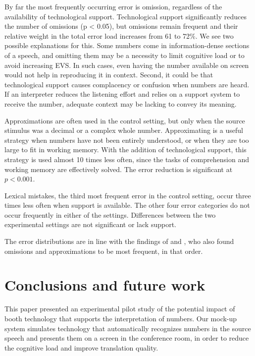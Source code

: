 \documentclass[output=paper]{langsci/langscibook}
\begin{document}
By far the most frequently occurring error is omission, regardless of the availability of technological support. Technological support significantly reduces the number of omissions (p < 0.05), but omissions remain frequent and their relative weight in the total error load increases from 61 to 72\%. We see two possible explanations for this. Some numbers come in information-dense sections of a speech, and omitting them may be a necessity to limit cognitive load or to avoid increasing \textsc{EVS}. In such cases, even having the number available on screen would not help in reproducing it in context. Second, it could be that technological support causes complacency or confusion when numbers are heard. If an interpreter reduces the listening effort and relies on a support system to receive the number, adequate context may be lacking to convey its meaning.

Approximations are often used in the control setting, but only when the source stimulus was a decimal or a complex whole number. Approximating is a useful strategy when numbers have not been entirely understood, or when they are too large to fit in working memory. With the addition of technological support, this strategy is used almost 10 times less often, since the tasks of comprehension and working memory are effectively solved. The error reduction is significant at $p < 0.001$.

Lexical mistakes, the third most frequent error in the control setting, occur three times less often when support is available. The other four error categories do not occur frequently in either of the settings. Differences between the two experimental settings are not significant or lack support.

The error distributions are in line with the findings of \citet{Mazza2001} and \citet{Pinochi2009}, who also found omissions and approximations to be most frequent, in that order.

\section{Conclusions and future work}

This paper presented an experimental pilot study of the potential impact of booth technology that supports the interpretation of numbers. Our mock-up system simulates technology that automatically recognizes numbers in the source speech and presents them on a screen in the conference room, in order to reduce the cognitive load and improve translation quality. 
\end{document}
